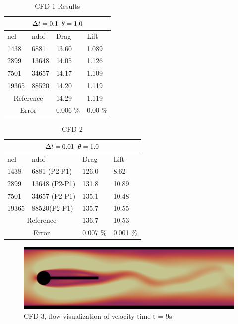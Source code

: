 \begin{table}[h!]
\centering
\caption{CFD 1 Results}
\label{CFD 1 Results}
\begin{tabular}{ |p{1cm}||p{2.7cm}|p{3.3cm}|p{3.3cm}|}
\hline
  \multicolumn{4}{|c|}{$\Delta t = 0.1 \hspace{2mm} \theta = 1.0$} \\
\hline
nel & ndof & Drag  & Lift \\
\hline
 1438    & 6881   & 13.60 & 1.089  \\
 2899    & 13648  & 14.05 & 1.126 \\
 7501    & 34657  & 14.17   & 1.109 \\
 19365   & 88520  & 14.20 & 1.119 \\
  \hline
  \multicolumn{2}{|c|}{Reference}  & 14.29   & 1.119\\
   \hline
    \multicolumn{2}{|c|}{Error}  & 0.006 \%   & 0.00 \%\\
   \hline
\end{tabular}
\end{table}

\begin{table}[h!]
\centering
\caption{CFD-2}
\label{CFD-2 Results}
\begin{tabular}{ |p{1cm}||p{2.7cm}|p{3.3cm}|p{3.3cm}|}
 \hline
  \multicolumn{4}{|c|}{$\Delta t = 0.01 \hspace{2mm} \theta = 1.0$} \\
   \hline
nel & ndof & Drag  & Lift \\
\hline
 1438    & 6881 (P2-P1)  & 126.0 &  8.62 \\
 2899    & 13648  (P2-P1)& 131.8 & 10.89  \\
 7501    & 34657 (P2-P1) & 135.1 & 10.48  \\
 19365   & 88520(P2-P1)  & 135.7 & 10.55  \\
 \hline
  \multicolumn{2}{|c|}{Reference}  & 136.7   & 10.53\\
   \hline
    \multicolumn{2}{|c|}{Error}  & 0.007 \%   & 0.001 \%\\
   \hline
\end{tabular}
\end{table}

\begin{figure}[h!]
  \centering
    \includegraphics[scale=0.2]{./Fig/cfd3.png}
      \caption{CFD-3, flow visualization of velocity time t = 9s}
\end{figure}

